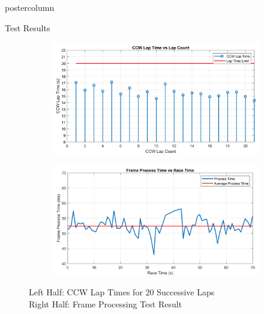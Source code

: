 \documentclass{beamer}
\begin{document}
\begin{frame}
\begin{columns}
\begin{column}{.5\textwidth}
\begin{beamercolorbox}[center]{postercolumn}
\begin{minipage}{.98\textwidth}
{\begin{myblock}{Test Results}
			\begin{figure}[H]
				\setlength{\unitlength}{\textwidth} 
				\centering
				\begin{subfigure}{.45\textwidth}
					\centering
					\includegraphics[width=\textwidth]{img/ccwLapTime_crop}
				\end{subfigure}%
				\begin{subfigure}{.45\textwidth}
					\centering
				\includegraphics[width=\textwidth]{img/ProcessTime_crop}
				\end{subfigure}
				\caption{\label{fig:test2} Left Half: CCW Lap Times for 20 Successive Laps \\ Right Half: Frame Processing Test Result }
			\end{figure}
			

\end{myblock}}
\end{minipage}
\end{beamercolorbox}
\end{column}
\end{columns}
\end{frame}
\end{document}
